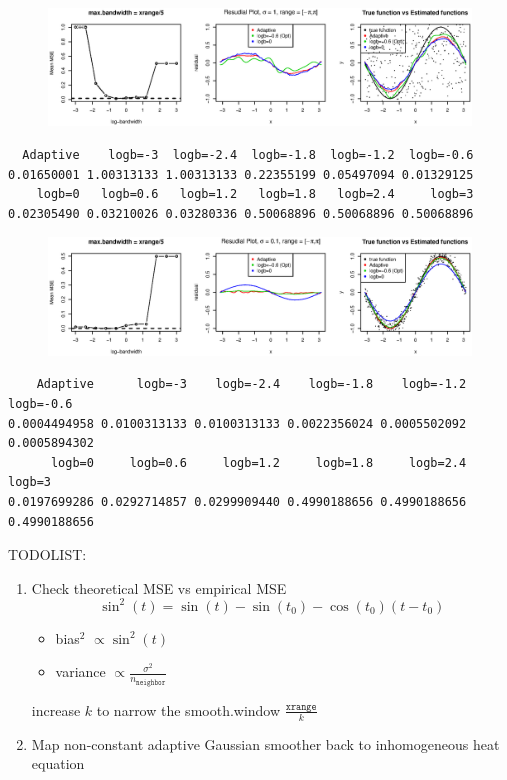 \documentclass{article}
\begin{document}
\begin{itemize}
\begin{figure}[H]
\includegraphics[width=\linewidth]{pic/sim.plot10.eps}
\end{figure}
\begin{verbatim}
  Adaptive    logb=-3  logb=-2.4  logb=-1.8  logb=-1.2  logb=-0.6 
0.01650001 1.00313133 1.00313133 0.22355199 0.05497094 0.01329125 
    logb=0   logb=0.6   logb=1.2   logb=1.8   logb=2.4     logb=3 
0.02305490 0.03210026 0.03280336 0.50068896 0.50068896 0.50068896
\end{verbatim}

\begin{figure}[H]
\includegraphics[width=\linewidth]{pic/sim.plot11.eps}
\end{figure}
\begin{verbatim}
    Adaptive      logb=-3    logb=-2.4    logb=-1.8    logb=-1.2    logb=-0.6 
0.0004494958 0.0100313133 0.0100313133 0.0022356024 0.0005502092 0.0005894302 
      logb=0     logb=0.6     logb=1.2     logb=1.8     logb=2.4       logb=3 
0.0197699286 0.0292714857 0.0299909440 0.4990188656 0.4990188656 0.4990188656 
\end{verbatim}


TODOLIST:
\begin{enumerate}
\item Check theoretical MSE vs empirical MSE
$$\sin^2(t) = \sin(t) - \sin(t_0)- \cos(t_0)(t-t_0)$$
\begin{itemize}
\item bias$^2$ $\propto \sin^2(t)$
\item variance $\propto \frac{\sigma^2}{n_{\texttt{neighbor}}}$
\end{itemize}
increase $k$ to narrow the smooth.window $ \frac{\texttt{xrange}}{k}$
\item Map non-constant adaptive Gaussian smoother back to inhomogeneous heat equation 
\end{enumerate}




\end{itemize}
\end{document}
